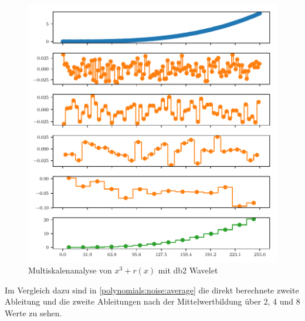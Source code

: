 \begin{refsection}
\begin{figure}
    \centering
    \includegraphics{papers/polynomials/images/polynomials_noise_db2_multi.pdf}
    \caption{Multiskalenanalyse von $x^3 + r(x)$ mit db2 Wavelet\label{polynomials:noise:db2_multi}}
\end{figure}

Im Vergleich dazu sind in \autoref{polynomials:noise:average} die direkt
berechnete zweite Ableitung und die zweite Ableitungen nach der
Mittelwertbildung über 2, 4 und 8 Werte zu sehen.


\end{refsection}
